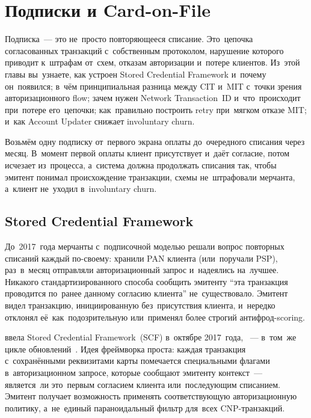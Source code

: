\chapter{Подписки и Card-on-File}
\label{ch:subscriptions}

\begin{kaobox}[title=Что вы узнаете из этой главы]
  Подписка~--- это не~просто повторяющееся списание. Это~цепочка согласованных
  транзакций с~собственным протоколом, нарушение которого приводит к~штрафам
  от~схем, отказам авторизации и~потере клиентов. Из~этой главы вы~узнаете,
  как устроен Stored Credential Framework и~почему он~появился; в~чём
  принципиальная разница между CIT и~MIT с~точки зрения авторизационного
  flow; зачем нужен Network Transaction~ID и~что~происходит при~потере
  его~цепочки; как~правильно построить retry при~мягком отказе MIT; и~как
  Account Updater снижает involuntary churn.
\end{kaobox}

Возьмём одну подписку от~первого экрана оплаты до~очередного
списания через месяц. В~момент первой оплаты клиент присутствует
и~даёт согласие, потом исчезает из~процесса, а~система должна
продолжать списания так, чтобы эмитент понимал происхождение
транзакции, схемы не~штрафовали мерчанта, а~клиент не~уходил
в~involuntary churn.


\section{Stored Credential Framework}
\label{sec:subscriptions-scf}

До~2017~года мерчанты с~подписочной моделью решали вопрос повторных
списаний каждый по-своему: хранили PAN клиента (или~поручали PSP),
раз~в~месяц отправляли авторизационный запрос и~надеялись на~лучшее.
Никакого стандартизированного способа сообщить эмитенту \enquote{эта
  транзакция проводится по~ранее данному согласию клиента} не~существовало.
Эмитент видел транзакцию, инициированную без~присутствия клиента, и~нередко
отклонял её~как~подозрительную или~применял более строгий антифрод-scoring.

 ввела Stored Credential Framework~(SCF) в~октябре 2017~года,
~--- в~том~же цикле обновлений~.
Идея фреймворка проста: каждая транзакция с~сохранёнными реквизитами
карты помечается специальными флагами в~авторизационном запросе, которые
сообщают эмитенту контекст~--- является~ли это~первым согласием клиента
или~последующим списанием. Эмитент получает возможность применять
соответствующую авторизационную политику, а~не~единый параноидальный
фильтр для~всех CNP-транзакций.

